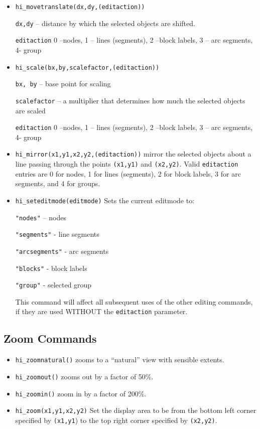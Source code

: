 \begin{itemize}
\item \texttt{hi\_movetranslate(dx,dy,(editaction))}

\texttt{dx,dy} -- distance by which the selected objects are shifted.

\texttt{editaction} 0 --nodes, 1 -- lines (segments), 2 --block labels, 3 --
arc segments, 4- group

\item \texttt{hi\_scale(bx,by,scalefactor,(editaction))}

\texttt{bx, by} -- base point for scaling

\texttt{scalefactor} -- a multiplier that determines how much the selected
objects are scaled

\texttt{editaction} 0 --nodes, 1 -- lines (segments), 2 --block labels, 3 --
arc segments, 4- group

\item \texttt{hi\_mirror(x1,y1,x2,y2,(editaction))} mirror the selected objects about
a line passing through the points \texttt{(x1,y1)} and
\texttt{(x2,y2)}. Valid \texttt{editaction} entries are 0 for
nodes, 1 for lines (segments), 2 for block labels, 3 for arc
segments, and 4 for groups.

\item \texttt{hi\_seteditmode(editmode)} Sets the current editmode to:

\texttt{"nodes"} -- nodes

\texttt{"segments"} - line segments

\texttt{"arcsegments"} - arc segments

\texttt{"blocks"} - block labels

\texttt{"group"} - selected group

This command will affect all subsequent uses of the other editing
commands, if they are used WITHOUT the \texttt{editaction}
parameter.
\end{itemize}

\subsection{Zoom Commands}

\begin{itemize}
\item \texttt{hi\_zoomnatural()} zooms to a ``natural'' view with sensible extents.

\item \texttt{hi\_zoomout()} zooms out by a factor of 50{\%}.

\item \texttt{hi\_zoomin()} zoom in by a factor of 200{\%}.

\item \texttt{hi\_zoom(x1,y1,x2,y2)} Set the display area to be from the bottom left
corner specified by \texttt{(x1,y1}) to the top right corner
specified by \texttt{(x2,y2)}.
\end{itemize}

